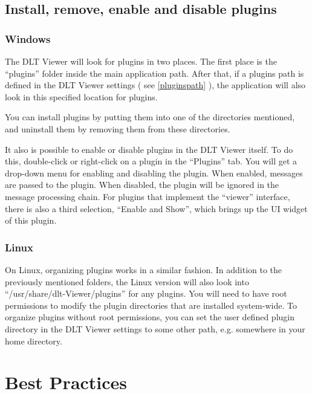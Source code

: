 \documentclass[a4paper,11pt]{article}
\begin{document}
\subsection{Install, remove, enable and disable plugins}
\label{installremoveplugins}

\subsubsection{Windows}
The DLT Viewer will look for plugins in two places. The first place is the
``plugins'' folder inside the main application path. After that, if a plugins path is
defined in the DLT Viewer settings ( see \autoref{pluginspath} ), the application will also look in this specified location for plugins.

You can install plugins by putting them into one of the directories mentioned,
and uninstall them by removing them from these directories.

It also is possible to enable or disable plugins in the DLT Viewer itself.
To do this, double-click or right-click on a plugin in the ``Plugins'' tab. You will get a
drop-down menu for enabling and disabling the plugin. When enabled,
messages are passed to the plugin. When disabled, the plugin will be ignored in
the message processing chain. For plugins that implement the ``viewer'' interface,
there is also a third selection, ``Enable and Show'', which brings up the UI widget of
this plugin.

\subsubsection{Linux}


On Linux, organizing plugins works in a similar fashion. In addition to the previously mentioned folders,
the Linux version will also look into ``/usr/share/dlt-Viewer/plugins'' for any plugins.
You will need to have root permissions to modify the plugin directories that are installed system-wide.
To organize plugins without root permissions, you can set the user defined plugin directory in the DLT Viewer
settings to some other path, e.g. somewhere in your home directory.



\section{Best Practices}
\end{document}
